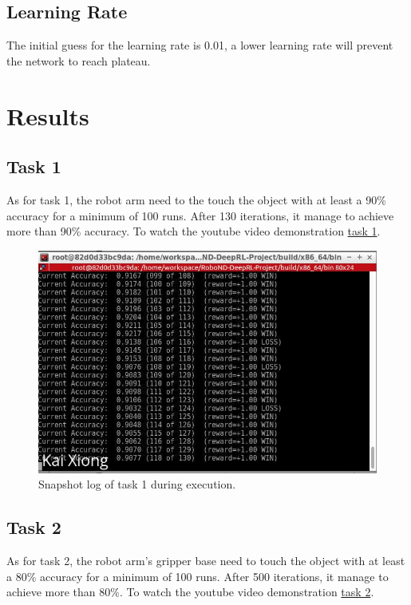 \documentclass[10pt,journal,compsoc]{IEEEtran}
\begin{document}
\subsection{Learning Rate}
The initial guess for the learning rate is 0.01, a lower learning rate will prevent the network to reach plateau.  

\section{Results}

\subsection{Task 1}
As for task 1, the robot arm need to the touch the object with at least a 90\% accuracy for a minimum of 100 runs. After 130 iterations, it manage to achieve more than 90\% accuracy. To watch the youtube video demonstration \href{https://youtu.be/ZcsphrfERE0}{task 1}.


\begin{figure}[thpb]
      \centering
      \includegraphics[scale=0.3]{task1_results_format.png}
      \caption{Snapshot log of task 1 during execution.}
      \label{fig:robot2}
\end{figure}

\subsection{Task 2}
As for task 2, the robot arm's gripper base need to touch the object with at least a 80\% accuracy for a minimum of 100 runs. After 500 iterations, it manage to achieve more than 80\%. To watch the youtube video demonstration \href{https://youtu.be/iC2EjrlD9BY}{task 2}.
\end{document}
